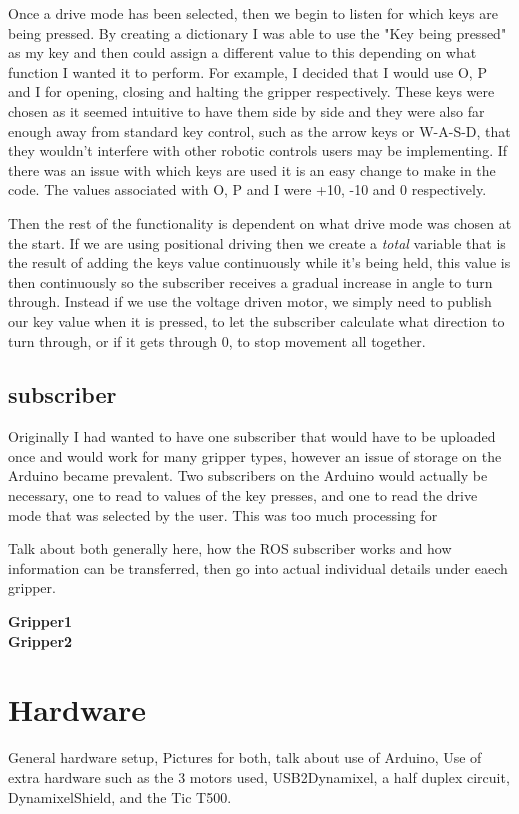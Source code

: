 \documentclass{l4proj}
\begin{document}
Once a drive mode has been selected, then we begin to listen for which keys are being pressed. By creating a dictionary I was able to use the "Key being pressed" as my key and then could assign a different value to this depending on what function I wanted it to perform. For example, I decided that I would use O, P and I for opening, closing and halting the gripper respectively. These keys were chosen as it seemed intuitive to have them side by side and they were also far enough away from standard key control, such as the arrow keys or W-A-S-D, that they wouldn't interfere with other robotic controls users may be implementing. If there was an issue with which keys are used it is an easy change to make in the code. The values associated with O, P and I were +10, -10 and 0 respectively. 

Then the rest of the functionality is dependent on what drive mode was chosen at the start. If we are using positional driving then we create a \textit{total} variable that is the result of adding the keys value continuously while it's being held, this value is then continuously so the subscriber receives a gradual increase in angle to turn through. Instead if we use the voltage driven motor, we simply need to publish our key value when it is pressed, to let the subscriber calculate what direction to turn through, or if it gets through 0, to stop movement all together. 

\subsection{subscriber}
Originally I had wanted to have one subscriber that would have to be uploaded once and would work for many gripper types, however an issue of storage on the Arduino became prevalent. Two subscribers on the Arduino would actually be necessary, one to read to values of the key presses, and one to read the drive mode that was selected by the user. This was too much processing for 

Talk about both generally here, how the ROS subscriber works and how information can be transferred, then go into actual individual details under eaech gripper. 

\textbf{Gripper1}\\

\textbf{Gripper2}\\



\section{Hardware}
General hardware setup, Pictures for both, talk about use of Arduino, Use of extra hardware such as the 3 motors used, USB2Dynamixel, a half duplex circuit, DynamixelShield, and the Tic T500. 
\end{document}

